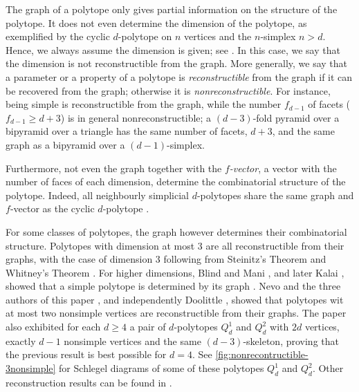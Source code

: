 \documentclass[a4paper]{amsart}
\theoremstyle{definition}
\theoremstyle{remark}
\begin{document}
The graph of a polytope  only gives partial information on the structure of the polytope. It does not even determine the dimension of the polytope, as exemplified by the cyclic $d$-polytope on $n$ vertices \cite[p.~11]{Zie95} and the $n$-simplex $n>d$. Hence,  we always assume the dimension is given; see \cite[Notes of Ch.~3]{Zie95}. In this case, we say that the dimension is not reconstructible from the graph. More generally, we say that a parameter or a property of a polytope is {\it reconstructible} from the graph if it can be recovered from the graph; otherwise it is {\it nonreconstructible}. For instance, being simple is reconstructible from the graph, while the number $f_{d-1}$ of facets ($f_{d-1}\ge d+3$) is in general nonreconstructible; a $(d-3)$-fold pyramid over a bipyramid over a triangle has the same number of facets,  $d+3$, and the same graph as a bipyramid over a $(d-1)$-simplex. 

Furthermore, not even the graph together with the {\it $f$-vector}, a vector with the number of faces of each dimension, determine the combinatorial structure of the polytope. Indeed, all neighbourly simplicial $d$-polytopes share the same graph and $f$-vector as the cyclic $d$-polytope \cite[Sec.~8.3-8.4]{Zie95}.
   

For some classes of polytopes, the graph however determines their combinatorial structure. Polytopes with dimension at most 3 are all reconstructible from their graphs, with the case of dimension 3 following from Steinitz's Theorem \cite[Ch.~4]{Zie95} and Whitney's Theorem \cite[Sec.~4.1]{Zie95}. For higher dimensions, Blind and Mani \cite{BliMan87}, and later Kalai \cite{Kal88}, showed that a simple polytope is determined by its graph \cite[Sec.~3.2]{Zie95}. Nevo and the three authors of this paper \cite{NevPinUgo17}, and independently Doolittle \cite{Doo17}, showed that polytopes wit at most two nonsimple vertices are reconstructible from their graphs. The paper \cite{NevPinUgo17} also exhibited for each $d\ge 4$ a pair of $d$-polytopes $Q^1_d$ and $Q^2_d$ with $2d$ vertices, exactly $d-1$ nonsimple vertices and the same $(d-3)$-skeleton, proving that the previous result is best possible for $d=4$. See \cref{fig:nonrecontructible-3nonsimple} for Schlegel diagrams of some of these polytopes $Q^1_d$ and $Q^2_d$. Other reconstruction results can be found in \cite[Sec.~20.5]{GooORo04}.
\end{document}
